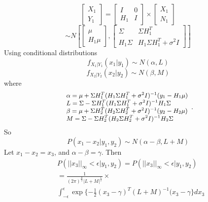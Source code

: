 \documentclass{article}
\begin{document}
\begin{equation}
 \left[\begin{array}{c} X_1 \\ Y_1 \end{array}\right] = 
\begin{bmatrix} I & 0 \\ H_1 & I \end{bmatrix} \times \left[ \begin{array}{c} X_1 \\ N_1 \end{array} \right]      
\end{equation}
\begin{equation}
 \sim N \left[\begin{bmatrix} \mu \\ H_1 \mu \end{bmatrix}, \begin{bmatrix} \Sigma & \Sigma H_1^T \\ H_1 \Sigma & H_1 \Sigma H_1^T + \sigma^2 I \end{bmatrix} \right]
\end{equation}
\noindent
Using conditional distributions
 \begin{equation}
  f_{X_1|Y_1}(x_1|y_1) \sim N(\alpha, L)
 \end{equation}
\begin{equation}
  f_{X_2|Y_2}(x_2|y_2) \sim N(\beta, M)
 \end{equation}
where 
\begin{equation}
\small{
\begin{array}{l}\alpha = \mu + \Sigma H_1^T (H_1 \Sigma H_1^T + \sigma^2 I)^{-1} (y_1 - H_1 \mu) \\ L = \Sigma - \Sigma H_1^T (H_1 \Sigma H_1^T + \sigma^2 I)^{-1} H_1 \Sigma \\ \beta = \mu + \Sigma H_2^T (H_2 \Sigma H_2^T + \sigma^2 I)^{-1} (y_2 - H_2 \mu) \\ M = \Sigma - \Sigma H_2^T (H_2 \Sigma H_2^T + \sigma^2 I)^{-1} H_2 \Sigma        \end{array}}   .
\end{equation}
So
\begin{equation}
P(x_1 - x_2|y_1, y_2) \sim N(\alpha-\beta, L+M)
\end{equation}
Let $x_1 - x_2 = x_3$, and $\alpha -\beta=\gamma$. Then
\begin{align}
&P(||x_3||_{\infty} < \epsilon|y_1,y_2)   \nonumber
										 =	 P(||x_3||_{\infty} < \epsilon|y_1,y_2)\\ \nonumber
										&=   \frac{1}{(2 \pi)^{\frac{n}{2}} |L+M|^ \frac{1}{2}} \times \\ 
										& \int_{-\epsilon }^{\epsilon}\exp \{ -\frac{1}{2}(x_3 - \gamma)^T(L+M)^{-1}(x_3 - \gamma\}dx_3 
\end{align}
\end{document}
